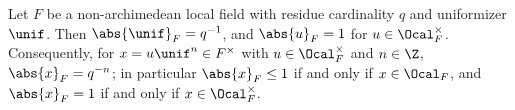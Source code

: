 Let $F$ be a non-archimedean local field with residue cardinality $q$ and uniformizer $\unif$. Then
$\abs{\unif}_F=q^{-1}$, and $\abs{u}_F=1$ for $u\in\Ocal_F^\times$. Consequently, for $x=u\unif^n\in F^\times$ with
$u\in\Ocal_F^\times$ and $n\in\Z$, $\abs{x}_F=q^{-n}$; in particular $\abs{x}_F\le1$ if and only if $x\in\Ocal_F$, and
$\abs{x}_F=1$ if and only if $x\in\Ocal_F^\times$.
